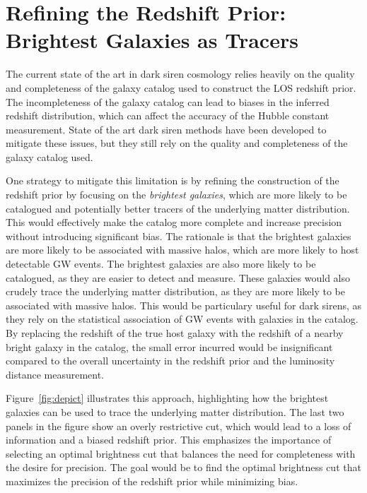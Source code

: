\section{Refining the Redshift Prior: Brightest Galaxies as Tracers}
The current state of the art in dark siren cosmology relies heavily on the quality and completeness of the galaxy catalog used to construct the \ac{LOS} redshift prior. 
The incompleteness of the galaxy catalog can lead to biases in the inferred redshift distribution, which can affect the accuracy of the Hubble constant measurement. State of the art dark siren methods have been developed to mitigate these issues, but they still rely on the quality and completeness of the galaxy catalog used.

One strategy to mitigate this limitation is by refining the construction of the redshift prior by focusing on the \textit{brightest galaxies}, which are more likely to be catalogued and potentially better tracers of the underlying matter distribution. This would effectively make the catalog more complete and increase precision without introducing significant bias. The rationale is that the brightest galaxies are more likely to be associated with massive halos, which are more likely to host detectable \ac{GW} events. The brightest galaxies are also more likely to be catalogued, as they are easier to detect and measure. These galaxies would also crudely trace the underlying matter distribution, as they are more likely to be associated with massive halos. This would be particulary useful for dark sirens, as they rely on the statistical association of \ac{GW} events with galaxies in the catalog. By replacing the redshift of the true host galaxy with the redshift of a nearby bright galaxy in the catalog, the small error incurred would be insignificant compared to the overall uncertainty in the redshift prior and the luminosity distance measurement.

Figure~\ref{fig:depict} illustrates this approach, highlighting how the brightest galaxies can be used to trace the underlying matter distribution. The last two panels in the figure show an overly restrictive cut, which would lead to a loss of information and a biased redshift prior. This emphasizes the importance of selecting an optimal brightness cut that balances the need for completeness with the desire for precision. The goal would be to find the optimal brightness cut that maximizes the precision of the redshift prior while minimizing bias.

